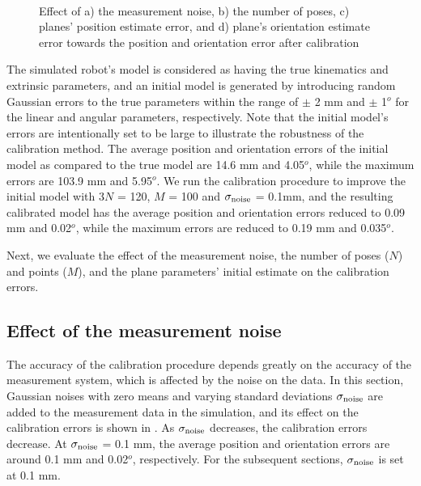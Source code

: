 \begin{figure*}[t]
  \centering
  \quad
  \\[-0.4ex]
  \centering
  \quad\quad
  \quad  
   \caption{Effect of a) the measurement noise, b) the number of poses, c) planes' position estimate error, and d) plane's orientation estimate error towards the position and orientation error after calibration}
\end{figure*}

The simulated robot's model is considered as having the true kinematics and extrinsic parameters, and an initial model is generated by introducing random Gaussian errors to the true parameters within the range of $\pm$ 2 mm and $\pm$ 1$^o$ for the linear and angular parameters, respectively. Note that the initial model's errors are intentionally set to be large to illustrate the robustness of the calibration method. The average position and orientation errors of the initial model as compared to the true model are 14.6 mm and 4.05$^o$, while the maximum errors are 103.9 mm and 5.95$^o$. We run the calibration procedure to improve the initial model with $3N$ = 120, $M$ = 100 and $\sigma_{\rm{noise}}$ = 0.1mm, and the resulting calibrated model has the average position and orientation errors reduced to 0.09 mm and 0.02$^o$, while the maximum errors are reduced to 0.19 mm and 0.035$^o$.

Next, we evaluate the effect of the measurement noise, the number of poses ($N$) and points ($M$), and the plane parameters' initial estimate on the calibration errors. 


\subsection{Effect of the measurement noise}
\label{sec:meas_accuracy}
The accuracy of the calibration procedure depends greatly on the accuracy of the measurement system, which is affected by the noise on the data. In this section, Gaussian noises with zero means and varying standard deviations $\sigma_{\rm{noise}}$ are added to the measurement data in the simulation, and its effect on the calibration errors is shown in . As $\sigma_{\rm{noise}}$ decreases, the calibration errors decrease. At $\sigma_{\rm{noise}}$ = 0.1 mm, the average position and orientation errors are around 0.1 mm and 0.02$^o$, respectively. For the subsequent sections, $\sigma_{\rm{noise}}$ is set at 0.1 mm. 

